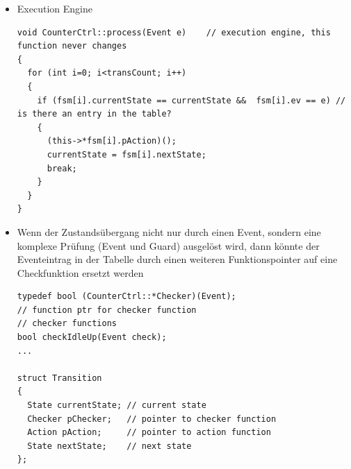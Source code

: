 \begin{itemize}
\item Execution Engine
\begin{lstlisting}
void CounterCtrl::process(Event e)    // execution engine, this function never changes
{
  for (int i=0; i<transCount; i++)
  {
    if (fsm[i].currentState == currentState &&  fsm[i].ev == e) // is there an entry in the table?
    {
      (this->*fsm[i].pAction)();
      currentState = fsm[i].nextState;
      break;
    }
  }
}
\end{lstlisting}
\item Wenn der Zustandsübergang nicht nur durch einen Event, sondern eine
komplexe Prüfung (Event und Guard) ausgelöst wird, dann könnte der Eventeintrag
in der Tabelle durch einen weiteren Funktionspointer auf eine Checkfunktion
ersetzt werden
\begin{lstlisting}
typedef bool (CounterCtrl::*Checker)(Event);
// function ptr for checker function 
// checker functions
bool checkIdleUp(Event check); 
...

struct Transition 
{
  State currentState; // current state
  Checker pChecker;   // pointer to checker function
  Action pAction;     // pointer to action function
  State nextState;    // next state
};
\end{lstlisting}
\end{itemize}

